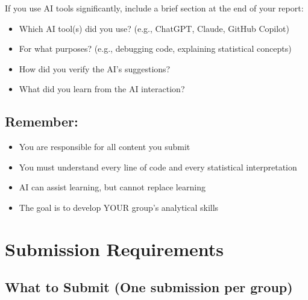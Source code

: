 \documentclass[11pt]{article}
\begin{document}
\begin{tcolorbox}[colback=aiblue!10,colframe=aiblue,title=\textbf{AI-Enhanced Learning for Group Projects}]
If you use AI tools significantly, include a brief section at the end of your report:

\begin{itemize}
\item Which AI tool(s) did you use? (e.g., ChatGPT, Claude, GitHub Copilot)
\item For what purposes? (e.g., debugging code, explaining statistical concepts)
\item How did you verify the AI's suggestions?
\item What did you learn from the AI interaction?
\end{itemize}

\subsection*{Remember:}

\begin{itemize}
\item You are responsible for all content you submit
\item You must understand every line of code and every statistical interpretation
\item AI can assist learning, but cannot replace learning
\item The goal is to develop YOUR group's analytical skills
\end{itemize}

\end{tcolorbox}

\newpage

\section*{Submission Requirements}

\subsection*{What to Submit (One submission per group)}
\end{document}
